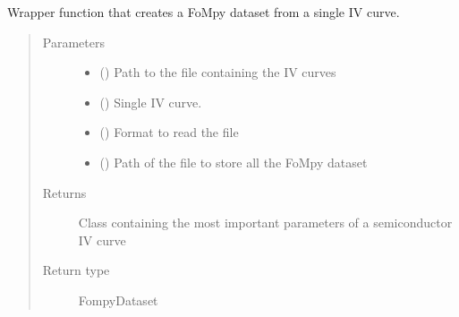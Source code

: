 \documentclass[letterpaper,10pt,english,openany, oneside]{sphinxmanual}
\begin{document}
\begin{fulllineitems}
\label{\detokenize{index:fompy.wrappers.iv}}
Wrapper function that creates a FoMpy dataset from a single IV curve.
\begin{quote}\begin{description}
\item[{Parameters}] \leavevmode\begin{itemize}
\item {} 
 () \textendash{} Path to the file containing the IV curves

\item {} 
 () \textendash{} Single IV curve.

\item {} 
 () \textendash{} Format to read the file

\item {} 
 () \textendash{} Path of the file to store all the FoMpy dataset

\end{itemize}

\item[{Returns}] \leavevmode
Class containing the most important parameters of a semiconductor IV curve

\item[{Return type}] \leavevmode
FompyDataset

\end{description}\end{quote}

\end{fulllineitems}

\end{document}
